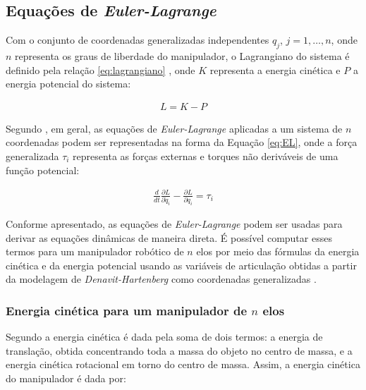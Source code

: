 \subsection{Equações de \textit{Euler-Lagrange}}
\label{EL}

Com o conjunto de coordenadas generalizadas independentes $q_j$, $j = 1, \dotsc, n$, onde $n$ 
representa os graus de liberdade do manipulador, o Lagrangiano do sistema 
é definido pela relação \eqref{eq:lagrangiano} \cite{Spong}, onde $K$ representa 
a energia cinética e $P$ a energia potencial do sistema:

\begin{equation}
  \begin{gathered}
    L = K - P
  \end{gathered}
  \label{eq:lagrangiano}
\end{equation}

Segundo , em geral, as equações de \textit{Euler-Lagrange}
aplicadas a um sistema de $n$ coordenadas podem ser representadas na forma da
Equação \eqref{eq:EL}, onde a força generalizada $\tau_i$ representa as forças 
externas e torques não deriváveis de uma função potencial:

\begin{equation}
  \begin{gathered}
    \frac{d}{dt}\frac{\partial L}{\partial \dot q_i}-\frac{\partial L}{\partial q_i} = \tau_i
  \end{gathered}
  \label{eq:EL}
\end{equation}

Conforme apresentado, as equações de \textit{Euler-Lagrange} podem ser 
usadas para derivar as equações dinâmicas de maneira direta. É possível computar 
esses termos para um manipulador robótico de $n$ elos por meio das fórmulas da 
energia cinética e da energia potencial usando as variáveis de articulação obtidas a partir da modelagem 
de \textit{Denavit-Hartenberg} como coordenadas generalizadas \cite{Spong}.

\subsubsection{Energia cinética para um manipulador de $n$ elos}

Segundo  a energia cinética é dada pela soma de dois 
termos: a energia de translação, obtida concentrando toda a massa do objeto no 
centro de massa, e a energia cinética rotacional em torno do centro de massa. 
Assim, a energia cinética do manipulador é dada por:

